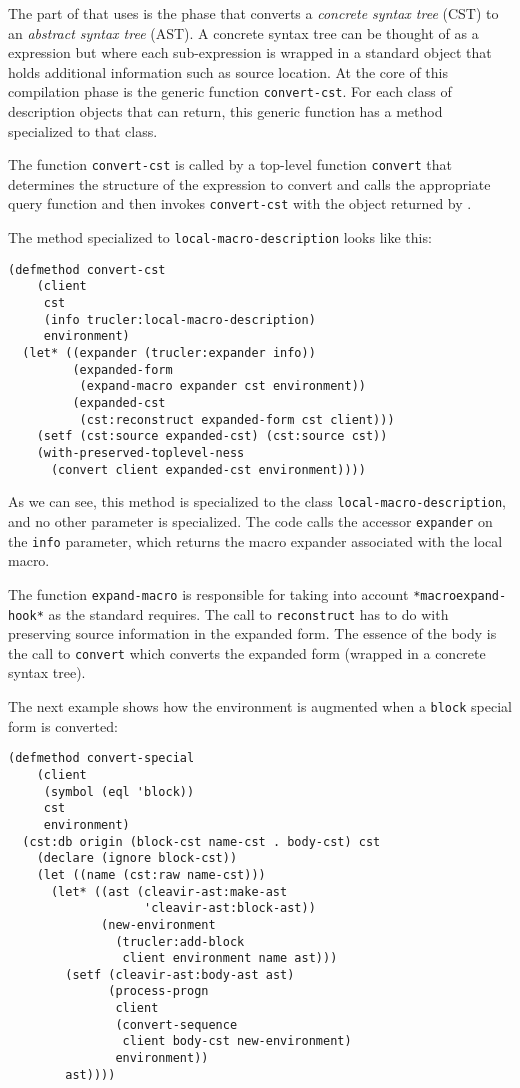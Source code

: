 The part of \cleavir{} that uses \trucler{} is the phase that converts
a \emph{concrete syntax tree} (CST) to an \emph{abstract syntax tree}
(AST).  A concrete syntax tree can be thought of as a \commonlisp{}
expression but where each sub-expression is wrapped in a standard
object that holds additional information such as source location.  At
the core of this compilation phase is the generic function
\texttt{convert-cst}.  For each class of description objects that
\trucler{} can return, this generic function has a method specialized
to that class.

The function \texttt{convert-cst} is called by a top-level function
\texttt{convert} that determines the structure of the expression to
convert and calls the appropriate \trucler{} query function and then
invokes \texttt{convert-cst} with the object returned by \trucler{}.

The method specialized to \texttt{local-macro-description} looks like
this:

{\small
\begin{verbatim}
(defmethod convert-cst
    (client
     cst
     (info trucler:local-macro-description)
     environment)
  (let* ((expander (trucler:expander info))
         (expanded-form
          (expand-macro expander cst environment))
         (expanded-cst
          (cst:reconstruct expanded-form cst client)))
    (setf (cst:source expanded-cst) (cst:source cst))
    (with-preserved-toplevel-ness
      (convert client expanded-cst environment))))
\end{verbatim}
}

\noindent
As we can see, this method is specialized to the \trucler{} class
\texttt{local-macro-description}, and no other parameter is
specialized.  The code calls the accessor \texttt{expander} on the
\texttt{info} parameter, which returns the macro expander associated
with the local macro.  

The function \texttt{expand-macro} is responsible for taking into
account \texttt{*macroexpand-hook*} as the \commonlisp{} standard
requires.  The call to \texttt{reconstruct} has to do with preserving
source information in the expanded form.  The essence of the body is
the call to \texttt{convert} which converts the expanded form (wrapped
in a concrete syntax tree).

The next example shows how the environment is augmented when a
\texttt{block} special form is converted:

{\small
\begin{verbatim}
(defmethod convert-special
    (client
     (symbol (eql 'block))
     cst
     environment)
  (cst:db origin (block-cst name-cst . body-cst) cst
    (declare (ignore block-cst))
    (let ((name (cst:raw name-cst)))
      (let* ((ast (cleavir-ast:make-ast
                   'cleavir-ast:block-ast))
             (new-environment
               (trucler:add-block
                client environment name ast)))
        (setf (cleavir-ast:body-ast ast)
              (process-progn
               client
               (convert-sequence
                client body-cst new-environment)
               environment))
        ast))))
\end{verbatim}
}

